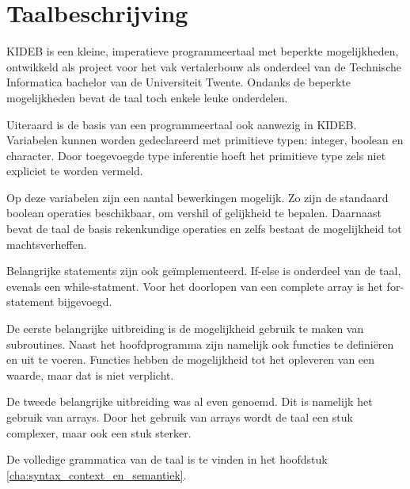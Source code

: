 \chapter{Taalbeschrijving} %
\label{cha:taalbeschrijving}
KIDEB is een kleine, imperatieve programmeertaal met beperkte mogelijkheden, ontwikkeld als project voor het vak vertalerbouw als onderdeel van de Technische Informatica bachelor van de Universiteit Twente. Ondanks de beperkte mogelijkheden bevat de taal toch enkele leuke onderdelen.

Uiteraard is de basis van een programmeertaal ook aanwezig in KIDEB. Variabelen kunnen worden gedeclareerd met primitieve typen: integer, boolean en character. Door toegevoegde type inferentie hoeft het primitieve type zels niet expliciet te worden vermeld. 

Op deze variabelen zijn een aantal bewerkingen mogelijk. Zo zijn de standaard boolean operaties beschikbaar, om vershil of gelijkheid te bepalen. Daarnaast bevat de taal de basis rekenkundige operaties en zelfs bestaat de mogelijkheid tot machtsverheffen.

Belangrijke statements zijn ook ge\"implementeerd. If-else is onderdeel van de taal, evenals een while-statment. Voor het doorlopen van een complete array is het for-statement bijgevoegd.

De eerste belangrijke uitbreiding is de mogelijkheid gebruik te maken van subroutines. Naast het hoofdprogramma zijn namelijk ook functies te defini\"eren en uit te voeren. Functies hebben de mogelijkheid tot het opleveren van een waarde, maar dat is niet verplicht.

De tweede belangrijke uitbreiding was al even genoemd. Dit is namelijk het gebruik van arrays. Door het gebruik van arrays wordt de taal een stuk complexer, maar ook een stuk sterker.

De volledige grammatica van de taal is te vinden in het hoofdstuk \ref{cha:syntax_context_en_semantiek}.

\clearpage